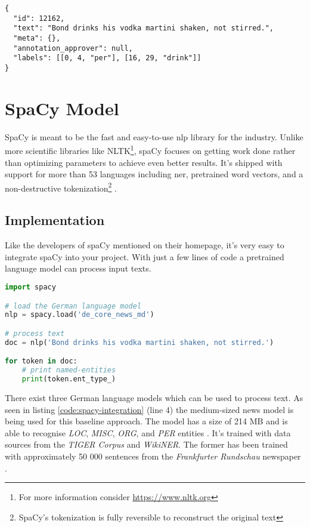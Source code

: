 \begin{lstlisting}[label={code:doccano-export}, caption=Sample export from Doccano as JSON (text labels)]
{
  "id": 12162,
  "text": "Bond drinks his vodka martini shaken, not stirred.",
  "meta": {},
  "annotation_approver": null,
  "labels": [[0, 4, "per"], [16, 29, "drink"]]
}
\end{lstlisting}

\section{SpaCy Model}

SpaCy is meant to be the fast and easy-to-use \acrshort{nlp} library for the industry. Unlike more scientific libraries like NLTK\footnote{For more
information consider \url{https://www.nltk.org}}, spaCy focuses on getting work done rather than optimizing parameters to achieve even better results.
It's shipped with support for more than 53 languages including \acrlong{ner}, pretrained word vectors, and a non-destructive tokenization\footnote{
SpaCy's tokenization is fully reversible to reconstruct the original text} \cite{spacy}.

\subsection{Implementation}

Like the developers of spaCy mentioned on their homepage, it's very easy to integrate spaCy into your project. With just a few lines of code a pretrained
language model can process input texts.

\begin{lstlisting}[language=Python, label={code:spacy-integration}, caption=Sample of a runnable spaCy model]
import spacy

# load the German language model
nlp = spacy.load('de_core_news_md')

# process text
doc = nlp('Bond drinks his vodka martini shaken, not stirred.')

for token in doc:
    # print named-entities
    print(token.ent_type_)
\end{lstlisting}

There exist three German language models which can be used to process text. As seen in listing \ref{code:spacy-integration} (line 4) the medium-sized
news model is being used for this baseline approach. The model has a size of 214 MB and is able to recognise \emph{LOC}, \emph{MISC}, \emph{ORG}, and
\emph{PER} entities \cite{gh-spacy}. It's trained with data sources from the \emph{TIGER Corpus} and \emph{WikiNER}. The former has been trained with
approximately 50 000 sentences from the \emph{Frankfurter Rundschau} newspaper \cite{tiger}.

